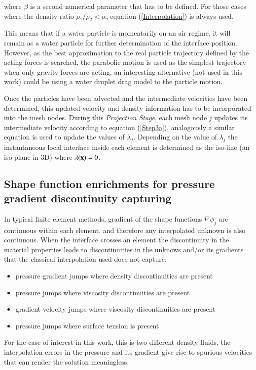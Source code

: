  where $\beta$ is a second numerical parameter that has to be defined. For those cases where the density ratio $\rho_1/\rho_2<\alpha$, equation (\ref{Interpolation}) is always used.

This means that if a water particle is momentarily on an air regime, it will remain as a water particle for further determination of the interface position. However, as the best approximation to the real particle trajectory defined by the acting forces is searched, the parabolic motion is used as the simplest trajectory when only gravity forces are acting, an interesting alternative (not used in this work) could be using a water droplet drag model to the particle motion.

Once the particles have been advected and the intermediate velocities have been determined, this updated velocity and density information has to be incorporated into the mesh nodes. During this \textit{Projection Stage}, each mesh node $j$ updates its intermediate velocity according to equation (\ref{Step3a}), analogously a similar equation is used to update the values of $\lambda_j$. Depending on the value of $\lambda_j$ the instantaneous local interface inside each element is determined as the iso-line (an iso-plane in 3D) where $\lambda(\mathbf{x})=0$.

\subsection[Enriched Shape Functions]{Shape function enrichments for pressure gradient discontinuity capturing}

In typical finite element methods, gradient of the shape functions $\nabla\phi_j$ are continuous within each element, and therefore any interpolated unknown is also continuous. When the interface crosses an element the discontinuity in the material properties leads to discontinuities in the unknows and/or its gradients that the classical interpolation used does not capture:
\begin{itemize}
\item pressure gradient jumps where density discontinuities are present
\item pressure jumps where viscosity discontinuities are present
\item gradient velocity jumps where viscosity discontinuities are present
\item pressure jumps where surface tension is present
\end{itemize}
For the case of interest in this work, this is two different density fluids, the interpolation errors in the pressure and its gradient give rise to spurious velocities that can render the solution meaningless.

